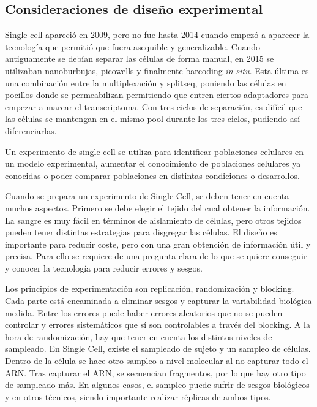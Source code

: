\subsection{Consideraciones de diseño experimental}
Single cell apareció en 2009, pero no fue hasta 2014 cuando empezó a aparecer la tecnología que permitió que fuera asequible y generalizable. Cuando antiguamente se debían separar las células de forma manual, en 2015 se utilizaban nanoburbujas, picowells y finalmente barcoding \textit{in situ}. Esta última es una combinación entre la multiplexación y splitseq, poniendo las células en pocillos donde se permeabilizan permitiendo que entren ciertos adaptadores para empezar a marcar el transcriptoma. Con tres ciclos de separación, es difícil que las células se mantengan en el mismo pool durante los tres ciclos, pudiendo así diferenciarlas. 

Un experimento de single cell se utiliza para identificar poblaciones celulares en un modelo experimental, aumentar el conocimiento de poblaciones celulares ya conocidas o poder comparar poblaciones en distintas condiciones o desarrollos. 

Cuando se prepara un experimento de Single Cell, se deben tener en cuenta muchos aspectos. Primero se debe elegir el tejido del cual obtener la información. La sangre es muy fácil en términos de aislamiento de células, pero otros tejidos pueden tener distintas estrategias para disgregar las células. El diseño es importante para reducir coste, pero con una gran obtención de información útil y precisa. Para ello se requiere de una pregunta clara de lo que se quiere conseguir y conocer la tecnología para reducir errores y sesgos. 

Los principios de experimentación son replicación, randomización y blocking. Cada parte está encaminada a eliminar sesgos y capturar la variabilidad biológica medida. Entre los errores puede haber errores aleatorios que no se pueden controlar y errores sistemáticos que sí son controlables a través del blocking. A la hora de randomización, hay que tener en cuenta los distintos niveles de sampleado. En Single Cell, existe el sampleado de sujeto y un sampleo de células. Dentro de la célula se hace otro sampleo a nivel molecular al no capturar todo el ARN. Tras capturar el ARN, se secuencian fragmentos, por lo que hay otro tipo de sampleado más.
En algunos casos, el sampleo puede sufrir de sesgos biológicos y en otros técnicos, siendo importante realizar réplicas de ambos tipos. 

